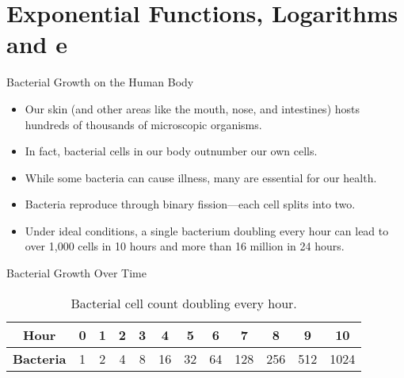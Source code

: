 \section{Exponential Functions, Logarithms and e}

\begin{frame}{Bacterial Growth on the Human Body}
  \begin{itemize}
    \item Our skin (and other areas like the mouth, nose, and intestines) hosts hundreds of thousands of microscopic organisms.
    \item In fact, bacterial cells in our body outnumber our own cells.
    \item While some bacteria can cause illness, many are essential for our health.
    \item Bacteria reproduce through binary fission—each cell splits into two.
    \item Under ideal conditions, a single bacterium doubling every hour can lead to over 1,000 cells in 10 hours and more than 16 million in 24 hours.
  \end{itemize}
\end{frame}

\begin{frame}{Bacterial Growth Over Time}
  \begin{table}[ht]
    \centering
    \begin{tabular}{c|ccccccccccc}
      \textbf{Hour} & 0 & 1 & 2 & 3 & 4 & 5 & 6 & 7 & 8 & 9 & 10 \\ \hline
      \textbf{Bacteria} & 1 & 2 & 4 & 8 & 16 & 32 & 64 & 128 & 256 & 512 & 1024 \\
    \end{tabular}
    \caption{Bacterial cell count doubling every hour.}
  \end{table}
\end{frame}


